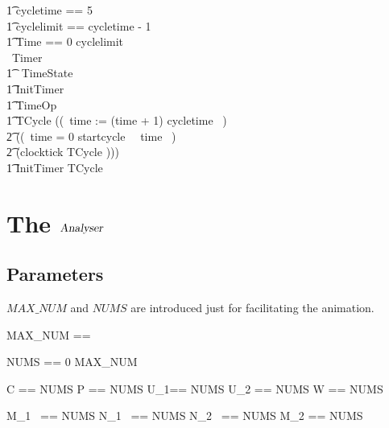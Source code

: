 \documentclass{report} %
\begin{document}
\begin{circus}
\t1 cycletime == 5 \\ %
\t1 cyclelimit == cycletime - 1 \\ %
\t1 Time == 0 \upto cyclelimit \\
   \circprocess\ Timer ~\circdef~ \circbegin \\

     \t1 \circstate\ TimeState  \\ %
     \t1 InitTimer  \\
     \t1 TimeOp  \\
     \t1 TCycle \circdef ((~time := (time + 1) \mod cycletime ~) \circseq \\ %
            \t2 ((\circif\ time = 0 \circthen startcycle \then \Skip\ \circelse\ time  \circthen \Skip\ \circfi) \circseq \\ %
            \t2 (clocktick \then \lschexpract TCycle \rschexpract)))
            \\
      \t1 \circspot \lschexpract InitTimer \rschexpract \circseq TCycle \\
   \circend
\end{circus}

\chapter{The $\mathsl{Analyser}$}
\section{Parameters}
$MAX\_NUM$ and $NUMS$ are introduced just for facilitating the animation.
\begin{zed}
  MAX\_NUM == \nat
\end{zed}

\begin{zed}
  NUMS == 0 \upto MAX\_NUM
\end{zed}

\begin{zed}
C == NUMS
\also
P == NUMS
\also
U\_1== NUMS
\also
U\_2 == NUMS
\also
W == NUMS
\end{zed}

\begin{zed}
M\_1~ == NUMS
\also
N\_1~ == NUMS
\also
N\_2~ == NUMS
\also
M\_2 == NUMS
\end{zed}
\end{document}
